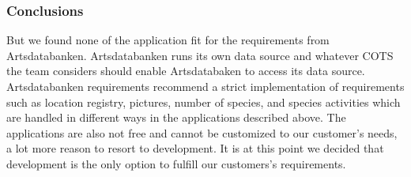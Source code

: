 \subsubsection{Conclusions}
But we found none of the application fit for the requirements from Artsdatabanken. Artsdatabanken runs its own data source and whatever COTS the team considers should enable Artsdatabaken to access its data source. Artsdatabanken requirements recommend a strict implementation of requirements such as location registry, pictures, number of species, and species activities which are handled in different ways in the applications described above. The applications are also not free and  cannot be customized to our customer's needs, a lot more reason to resort to development. It is at this point we decided that development is the only option to fulfill our customers's requirements.

